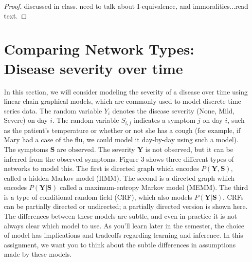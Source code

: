 \documentclass[12pt]{article}
\begin{document}
\begin{enumerate}[1.]
\begin{proof}
discussed in class. need to talk about I-equivalence, and immoralities...read text.
\end{proof}

\end{enumerate}
\section{Comparing Network Types: Disease severity over time}
In this section, we will consider modeling the severity of a disease over time using linear chain graphical models, which are commonly used to model discrete time series data.
The random variable $Y_i$ denotes the disease severity (None, Mild, Severe) on day $i$. The random variable $S_{i,j}$ indicates a symptom $j$ on day $i$, such as the patient’s temperature or whether or not she has a cough (for example, if Mary had a case of the flu, we could model it day-by-day using such a model). The symptoms $\mathbf{S}$ are observed. The severity $\mathbf{Y}$ is not observed, but it can be inferred from the observed symptoms.
Figure 3 shows three different types of networks to model this. The first is directed graph which encodes $P(\mathbf{Y}, \mathbf{S})$, called a hidden Markov model (HMM). The second is a directed graph which encodes $P(\mathbf{Y}|\mathbf{S})$ called a maximum-entropy Markov model (MEMM). The third is a type of conditional random field (CRF), which also models $P(\mathbf{Y}|\mathbf{S})$. CRFs can be partially directed or undirected; a partially directed version is shown here.
The differences between these models are subtle, and even in practice it is not always clear which model to use. As you’ll learn later in the semester, the choice of model has implications and tradeoffs regarding learning and inference. In this assignment, we want you to think about the subtle differences in assumptions made by these models.
\end{document}
